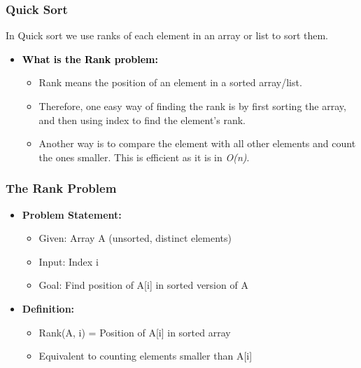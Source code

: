 \begin{frame}
    \frametitle{Quick Sort}
    In  Quick sort we use ranks of each element in an array or list to sort them.
    \begin{itemize}
        \item\textbf{\textcolor{black}{What is the Rank problem:}}
        \begin{itemize}
            \item Rank means the position of an element in a sorted array/list.
            \vspace{0.2cm}
            \item Therefore, one easy way of finding the rank is by first sorting the array, and then using index to find the element's rank.
            \vspace{0.2cm}
            \item Another way is to compare the element with all other elements and count the ones smaller. This is efficient as it is in \textit{O(n)}.
            
        \end{itemize}
    \end{itemize}
\end{frame}




\begin{frame}
    \frametitle{The Rank Problem}
    \begin{itemize}
        \item \textbf{Problem Statement:} 
        \begin{itemize}
            \item Given: Array A (unsorted, distinct elements)
            \item Input: Index i
            \item Goal: Find position of A[i] in sorted version of A
        \end{itemize}
        \vspace{0.3cm}
        \item \textbf{Definition:} 
        \begin{itemize}
            \item Rank(A, i) = Position of A[i] in sorted array
            \item Equivalent to counting elements smaller than A[i]
        \end{itemize}
    \end{itemize}
\end{frame}

